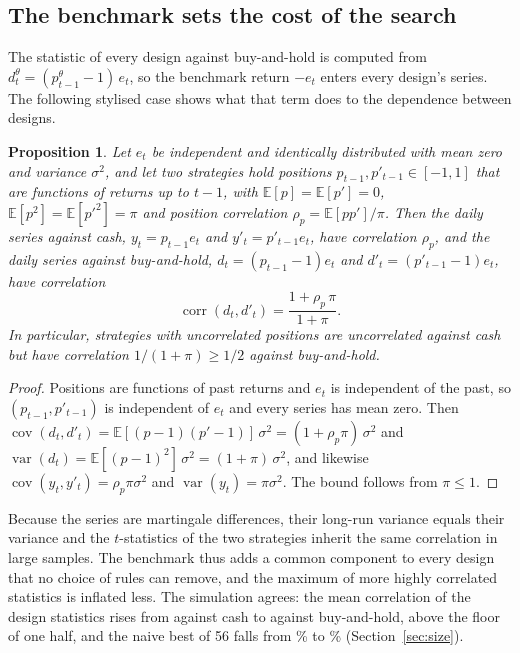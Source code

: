\documentclass[pdflatex,sn-basic]{sn-jnl}
\theoremstyle{thmstyleone}
\newtheorem{proposition}{Proposition}
\theoremstyle{thmstylethree}
\newcommand{\E}{\mathbb{E}}
\begin{document}
\subsection{The benchmark sets the cost of the search}\label{sec:benchmark}

The statistic of every design against buy-and-hold is computed from
$d^{\theta}_t=(p^{\theta}_{t-1}-1)\,e_t$, so the benchmark return $-e_t$ enters every design's series.
The following stylised case shows what that term does to the dependence between designs.

\begin{proposition}\label{prop:floor}
Let $e_t$ be independent and identically distributed with mean zero and variance $\sigma^2$, and let
two strategies hold positions $p_{t-1},p'_{t-1}\in[-1,1]$ that are functions of returns up to $t-1$,
with $\E[p]=\E[p']=0$, $\E[p^2]=\E[p'^2]=\pi$ and position correlation $\rho_p=\E[pp']/\pi$. Then the
daily series against cash, $y_t=p_{t-1}e_t$ and $y'_t=p'_{t-1}e_t$, have correlation $\rho_p$, and
the daily series against buy-and-hold, $d_t=(p_{t-1}-1)e_t$ and $d'_t=(p'_{t-1}-1)e_t$, have
correlation
\[
\operatorname{corr}(d_t,d'_t)=\frac{1+\rho_p\,\pi}{1+\pi}.
\]
In particular, strategies with uncorrelated positions are uncorrelated against cash but have
correlation $1/(1+\pi)\ge 1/2$ against buy-and-hold.
\end{proposition}

\begin{proof}
Positions are functions of past returns and $e_t$ is independent of the past, so $(p_{t-1},p'_{t-1})$ is
independent of $e_t$ and every series has mean zero. Then
$\operatorname{cov}(d_t,d'_t)=\E[(p-1)(p'-1)]\,\sigma^2=(1+\rho_p\pi)\,\sigma^2$ and
$\operatorname{var}(d_t)=\E[(p-1)^2]\,\sigma^2=(1+\pi)\,\sigma^2$, and likewise
$\operatorname{cov}(y_t,y'_t)=\rho_p\pi\sigma^2$ and $\operatorname{var}(y_t)=\pi\sigma^2$. The bound
follows from $\pi\le 1$.
\end{proof}

Because the series are martingale differences, their long-run variance equals their variance and the
$t$-statistics of the two strategies inherit the same correlation in large samples. The benchmark thus
adds a common component to every design that no choice of rules can remove, and the maximum of more
highly correlated statistics is inflated less. The simulation agrees: the mean correlation of the
design statistics rises from \NumMeanCorrTCash{} against cash to \NumMeanCorrT{} against buy-and-hold,
above the floor of one half, and the naive best of 56 falls from \NumSizeBestNaiveCash\% to
\NumSizeBestNaive\% (Section~\ref{sec:size}).
\end{document}
